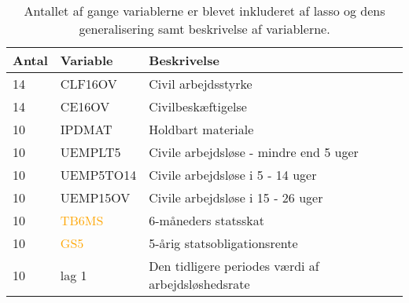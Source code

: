 \begin{table}[ht] 
\centering 
\begin{tabular}{lll}
\toprule 
Antal & Variable & Beskrivelse \\ \midrule
14 &\textcolor{blue3}{CLF16OV} & Civil arbejdsstyrke \\
14 &\textcolor{blue3}{CE16OV} & Civilbeskæftigelse \\
10 & \textcolor{chartreuse4}{IPDMAT} & Holdbart materiale  \\
10 & \textcolor{blue3}{UEMPLT5} & Civile arbejdsløse - mindre end 5 uger \\
10 & \textcolor{blue3}{UEMP5TO14}& Civile arbejdsløse i 5 - 14 uger \\
10 & \textcolor{blue3}{UEMP15OV} &  Civile arbejdsløse i 15 - 26 uger  \\
10 & \textcolor{orange}{TB6MS} & 6-måneders statsskat  \\
10 & \textcolor{orange}{GS5} & 5-årig statsobligationsrente \\
10 & \textcolor{blue3}{lag 1} & Den tidligere periodes værdi af arbejdsløshedsrate \\
\bottomrule
\end{tabular}  
\caption{Antallet af gange variablerne er blevet inkluderet af lasso og dens generalisering samt beskrivelse af variablerne.} \label{tab:topvariable}
\end{table} 